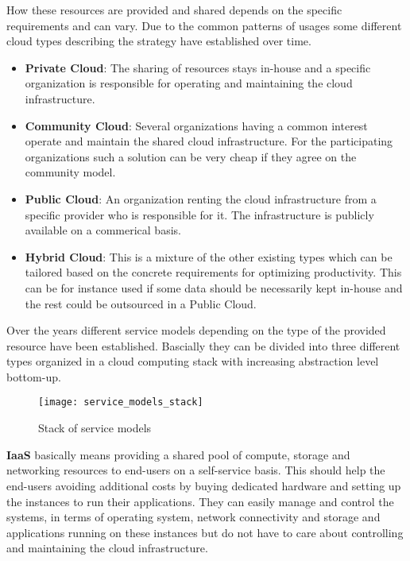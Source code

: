 How these resources are provided and shared depends on the specific requirements and can vary. Due to the common patterns of usages some different cloud types describing the strategy have established over time. \cite{Dialogic_Corporation}
\begin{itemize}
	\item \textbf{Private Cloud}: The sharing of resources stays in-house and a specific organization is responsible for operating and maintaining the cloud infrastructure.
	\item \textbf{Community Cloud}: Several organizations having a common interest operate and maintain the shared cloud infrastructure. For the participating organizations such a solution can be very cheap if they agree on the community model.
	\item \textbf{Public Cloud}: An organization renting the cloud infrastructure from a specific provider who is responsible for it. The infrastructure is publicly available on a commerical basis. 
	\item \textbf{Hybrid Cloud}: This is a mixture of the other existing types which can be tailored based on the concrete requirements for optimizing productivity. This can be for instance used if some data should be necessarily kept in-house and the rest could be outsourced in a Public Cloud.
	\end{itemize} 

Over the years different service models depending on the type of the provided resource have been established. 
Bascially they can be divided into three different types organized in a cloud computing stack with increasing abstraction level bottom-up.

\begin{figure}[h!]
	\centering
		\texttt{[image: service\_models\_stack]}
	\caption{Stack of service models}
\end{figure}

\textbf{IaaS} basically means providing a shared pool of compute, storage and networking resources to end-users on a self-service basis. \cite{Oracle} This should help the end-users avoiding additional costs by buying dedicated hardware and setting up the instances to run their applications. They can easily manage and control the systems, in terms of operating system, network connectivity and storage and applications running on these instances but do not have to care about controlling and maintaining the cloud infrastructure. \cite{Dialogic_Corporation}

